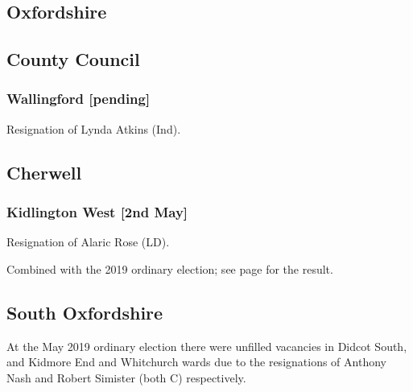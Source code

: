 \documentclass[a4paper,openany]{book}
\begin{document}
\begin{resultsiii}
\section{Oxfordshire}

\subsection*{County Council}

\subsubsection*{Wallingford \hspace*{\fill}\nolinebreak[1]%
	\enspace\hspace*{\fill}
	[pending]}


Resignation of Lynda Atkins (Ind).

\subsection*{Cherwell}

\subsubsection*{Kidlington West \hspace*{\fill}\nolinebreak[1]%
	\enspace\hspace*{\fill}
	[2nd May]}


Resignation of Alaric Rose (LD).

Combined with the 2019 ordinary election; see page \pageref{CherwellKidlingtonWest} for the result.

\subsection*{South Oxfordshire}

At the May 2019 ordinary election there were unfilled vacancies in Didcot South, and Kidmore End and Whitchurch wards due to the resignations of Anthony Nash and Robert Simister (both C) respectively.


\end{resultsiii}
\end{document}
